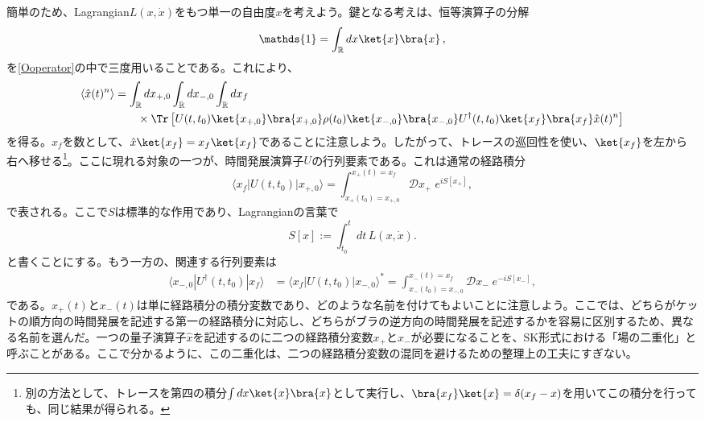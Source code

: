 \documentclass[a4paper,11pt,oneside]{article}
\theoremstyle{definition}
\numberwithin{equation}{section}
\begin{document}
簡単のため、Lagrangian$  L(x,\dot x) $をもつ単一の自由度$  x $を考えよう。鍵となる考えは、恒等演算子の分解
\begin{align}
\mathds{1}=\int_{\mathbb{R}} dx \ket{x}\bra{x}\,,
\end{align}
を\eqref{Ooperator}の中で三度用いることである。これにより、
\begin{align}\label{3resolutions}
\langle \hat x(t)^{n}\rangle&=\int_{\mathbb{R}} dx_{+,0} \int_{\mathbb{R}} dx_{-,0} \int_{\mathbb{R}} dx_{f} \\
& \qquad \times \Tr\left[ U(t,t_0)\ket{x_{+,0}}\bra{x_{+,0}}\rho(t_0)\ket{x_{-,0}}\bra{x_{-,0}} U^\dagger(t,t_0)\ket{x_{f}}\bra{x_{f}} \hat x(t)^{n}
\right] \nonumber 
\end{align}
を得る。$ x_{f}$を数として、$ \hat x \ket{x_{f}}=x_{f}\ket{x_{f}}$であることに注意しよう。したがって、トレースの巡回性を使い、$ \ket{x_{f}} $を左から右へ移せる\footnote{別の方法として、トレースを第四の積分$  \int dx \ket{x}\bra{x}$として実行し、$ \bra{x_{f}}\ket{x}=\delta(x_{f}-x)$を用いてこの積分を行っても、同じ結果が得られる。}。ここに現れる対象の一つが、時間発展演算子$ U$の行列要素である。これは通常の経路積分
\begin{equation}\label{pathintegral}
\langle x_f|U(t,t_0)|x_{+,0}\rangle
=
\int_{x_{+}(t_0)=x_{+,0}}^{x_{+}(t)=x_f}\!\!\!\!\!\!\!\!\!\!\!\!\!\! \mathcal D x_{+}\;
e^{ iS[x_{+}] },
\end{equation}
で表される。ここで$ S$は標準的な作用であり、Lagrangianの言葉で
\begin{equation}
S[x]:=\int_{t_0}^{t}dt\,L(x,\dot x) .
\end{equation}
と書くことにする。もう一方の、関連する行列要素は
\begin{align}\label{backpathintegral}
\langle x_{-,0}|U^{\dagger}(t,t_0)|x_f\rangle
&=\langle x_{f}|U(t,t_0)|x_{-,0}\rangle^{\ast} = \int_{x_{-}(t_0)=x_{-,0}}^{x_{-}(t)=x_f}\!\!\!\!\!\!\!\!\!\!\!\!\!\! \mathcal D x_{-}\;
e^{ -iS[x_{-}] } ,
\end{align}
である。$ x_{+}(t)  $と$ x_{-}(t)  $は単に経路積分の積分変数であり、どのような名前を付けてもよいことに注意しよう。ここでは、どちらがケットの順方向の時間発展を記述する第一の経路積分に対応し、どちらがブラの逆方向の時間発展を記述するかを容易に区別するため、異なる名前を選んだ。一つの量子演算子$ \hat x$を記述するのに二つの経路積分変数$ x_{+}$と$ x_{-}$が必要になることを、SK形式における「場の二重化」と呼ぶことがある。ここで分かるように、この二重化は、二つの経路積分変数の混同を避けるための整理上の工夫にすぎない。
\end{document}
